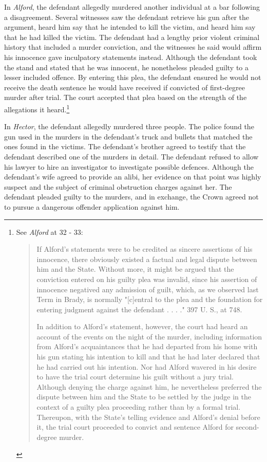 In \textit{Alford}, the defendant allegedly murdered another individual at a bar following a disagreement. Several witnesses saw the defendant retrieve his gun after the argument, heard him say that he intended to kill the victim, and heard him say that he had killed the victim. The defendant had a lengthy prior violent criminal history that included a murder conviction, and the witnesses he said would affirm his innocence gave inculpatory statements instead. Although the defendant took the stand and stated that he was innocent, he nonetheless pleaded guilty to a lesser included offence. By entering this plea, the defendant ensured he would not receive the death sentence he would have received if convicted of first-degree murder after trial. The court accepted that plea based on the strength of the allegations it heard.\footnote{See \textit{Alford} at 32 - 33: \begin{quote}
    If Alford's statements were to be credited as sincere assertions of his innocence, there obviously existed a factual and legal dispute between him and the State. Without more, it might be argued that the conviction entered on his guilty plea was invalid, since his assertion of innocence negatived any admission of guilt, which, as we observed last Term in Brady, is normally "[c]entral to the plea and the foundation for entering judgment against the defendant . . . ." 397 U. S., at 748.
    
    In addition to Alford's statement, however, the court had heard an account of the events on the night of the murder, including information from Alford's acquaintances that he had departed from his home with his gun stating his intention to kill and that he had later declared that he had carried out his intention. Nor had Alford wavered in his desire to have the trial court determine his guilt without a jury trial. Although denying the charge against him, he nevertheless preferred the dispute between him and the State to be settled by the judge in the context of a guilty plea proceeding rather than by a formal trial. Thereupon, with the State's telling evidence and Alford's denial before it, the trial court proceeded to convict and sentence Alford for second-degree murder.
\end{quote}}

In \textit{Hector}, the defendant allegedly murdered three people. The police found the gun used in the murders in the defendant's truck and bullets that matched the ones found in the victims. The defendant's brother agreed to testify that the defendant described one of the murders in detail. The defendant refused to allow his lawyer to hire an investigator to investigate possible defences. Although the defendant's wife agreed to provide an alibi, her evidence on that point was highly suspect and the subject of criminal obstruction charges against her. The defendant pleaded guilty to the murders, and in exchange, the Crown agreed not to pursue a dangerous offender application against him.

